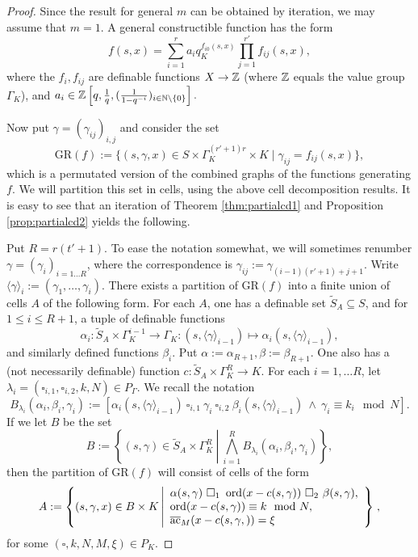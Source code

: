 \begin{proof}
Since the result for general $m$ can be obtained by iteration, we may assume that $m =1$. A general constructible function has the form
\[f(s,x) = \sum_{i=1}^r a_i q_K^{f_{i0}(s,x)} \prod_{j=1}^{r'}f_{ij}(s,x),\]
where the $f_i, f_{ij}$ are definable functions $X \to {\mathbb Z}$ (where ${\mathbb Z}$ equals the value group $\Gamma_K$), and $a_i \in {\mathbb Z}\left[q, \frac1q, (\frac{1}{1-q^{-i}})_{i\in {\mathbb N}\backslash\{0\}}\right].$

Now put $\gamma = (\gamma_{ij})_{i,j}$ and consider the set
\[\text{GR}(f):= \{(s,\gamma, x)\in S\times \Gamma_K^{(r'+1)r}\times K \mid  \gamma_{ij} = f_{ij}(s,x)\},\]
which is a permutated version of the combined graphs of the functions generating $f$. We will partition this set in cells, using the above cell decomposition results. It is easy to see that an iteration of Theorem \ref{thm:partialcd1} and Proposition \ref{prop:partialcd2} yields the following.

Put $R = r(t'+1)$. To ease the notation somewhat, we will sometimes renumber $\gamma =(\gamma_i)_{i=1\ldots R}$, where the correspondence is $\gamma_{ij}:= \gamma_{(i-1)(r'+1)+j+1}$.
Write $\langle \gamma\rangle_i := (\gamma_1, \ldots, \gamma_{i})$.
There exists a partition of $\text{GR}(f)$ into a finite union of cells $A$ of the following form. 
For each $A$, one has a definable set $\tilde{S}_A \subseteq S$, and for $1 \leqslant i \leqslant R+1$, a tuple of definable functions
\[\alpha_i: \tilde{S}_A \times \Gamma_K^{i-1} \to \Gamma_K: (s, \langle \gamma\rangle_{i-1}) \mapsto \alpha_i(s, \langle \gamma\rangle_{i-1}),\]
and similarly defined functions $\beta_i$. Put $\alpha := \alpha_{R+1}, \beta:= \beta_{R+1}$.  One also has a (not necessarily definable) function $c: \tilde{S}_A \times \Gamma_K^{R}\to K$.
For each $i =1, \ldots R$, let $\lambda_i =(\square_{i,1}, \square_{i,2},k,N) \in P_{\Gamma}$. We recall the notation 
\[
B_{\lambda_i}(\alpha_i,\beta_i,\gamma_i):=  [\alpha_i(s,\langle \gamma\rangle_{i-1})\ \square_{i,1} \ \gamma_i \ \square_{i,2} \ \beta_i(s,\langle \gamma\rangle_{i-1}) \ \wedge \
 \gamma_i \equiv k_i\mod N] .
\]
If we let $B$ be the set \[
B:= \left\{(s,\gamma) \in \tilde{S}_A \times \Gamma_K^R \ \left| \ \bigwedge_{i=1}^R B_{\lambda_i}(\alpha_i,\beta_i,\gamma_i)\right\}\right.,\]
then the partition of $\text{GR}(f)$ will consist of cells of the form
\[A:=\left\{(s, \gamma, x) \in B \times K \left| \begin{array}{l} 
\alpha(s,\gamma) \ \square_{1}\ \ord(x -c(s,\gamma)) \ \square_{2}\ \beta(s, \gamma),\\
\ord(x -c(s,\gamma)) \equiv k \mod N,\\ \ac_M(x -c(s,\gamma, )) = \xi
\end{array}
\right\}\right.,\]
for some $(\square, k, N, M, \xi) \in P_K$.


\end{proof}
